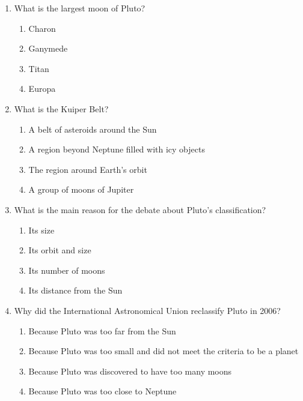 \documentclass[12pt]{article}
\begin{document}
\begin{enumerate}
    \vspace{0.5cm}

    \item What is the largest moon of Pluto?

    \begin{enumerate}[label=\Alph*.]
        \item Charon
        \item Ganymede
        \item Titan
        \item Europa
    \end{enumerate}
    
    \vspace{0.5cm}

    \item What is the Kuiper Belt?

    \begin{enumerate}[label=\Alph*.]
        \item A belt of asteroids around the Sun
        \item A region beyond Neptune filled with icy objects
        \item The region around Earth’s orbit
        \item A group of moons of Jupiter
    \end{enumerate}
    
    \vspace{0.5cm}

    \item What is the main reason for the debate about Pluto’s classification?

    \begin{enumerate}[label=\Alph*.]
        \item Its size
        \item Its orbit and size
        \item Its number of moons
        \item Its distance from the Sun
    \end{enumerate}
    
    \vspace{0.5cm}

    \item Why did the International Astronomical Union reclassify Pluto in 2006?

    \begin{enumerate}[label=\Alph*.]
        \item Because Pluto was too far from the Sun
        \item Because Pluto was too small and did not meet the criteria to be a planet
        \item Because Pluto was discovered to have too many moons
        \item Because Pluto was too close to Neptune
    \end{enumerate}
    

\end{enumerate}
\end{document}
